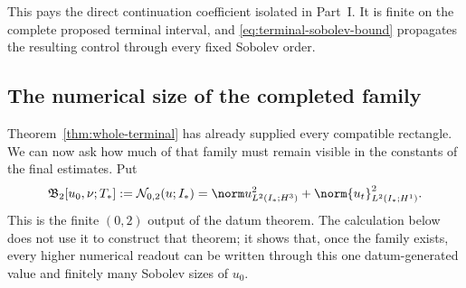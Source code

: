 This pays the direct continuation coefficient isolated in Part~I.  It is
finite on the complete proposed terminal interval, and
\eqref{eq:terminal-sobolev-bound} propagates the resulting control through
every fixed Sobolev order.

\subsection{The numerical size of the completed family}

Theorem~\ref{thm:whole-terminal} has already supplied every compatible
rectangle.  We can now ask how much of that family must remain visible in the
constants of the final estimates.  Put
\begin{equation}
 \mathfrak B_2[u_0,\nu;T_*]
 :=\mathcal N_{0,2}(u;I_*)
 =\norm u_{L^2(I_*;H^3)}^2
  +\norm{u_t}_{L^2(I_*;H^1)}^2.
 \label{eq:base-producer-value}
\end{equation}
This is the finite \((0,2)\) output of the datum theorem.  The calculation
below does not use it to construct that theorem; it shows that, once the
family exists, every higher numerical readout can be written through this one
datum-generated value and finitely many Sobolev sizes of \(u_0\).

